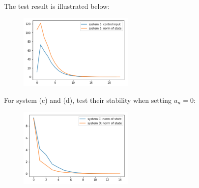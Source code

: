 The test result is illustrated below:
\begin{figure}[ht]
    \centering
    \includegraphics[width=0.5\textwidth]{imgs/p2_1.png}
\end{figure}

For system (c) and (d), test their stability when setting \( u_n = 0 \):
\begin{figure}[ht]
    \centering
    \includegraphics[width=0.5\textwidth]{imgs/p2_2.png}
\end{figure}
